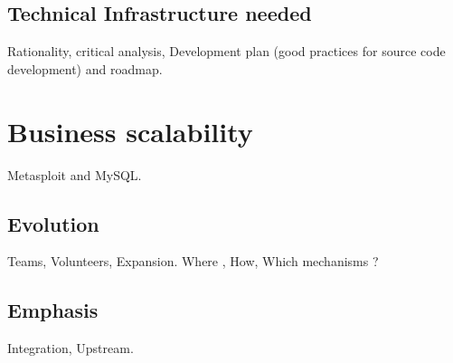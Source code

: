 \documentclass[11pt]{scrartcl}
\begin{document}

\subsection{Technical Infrastructure needed}
\label{sub:infrastructure}

\par Rationality, critical analysis, Development plan (good practices for source code development) and roadmap.


\section{Business scalability}
\label{sec:scalability}

\par Metasploit and MySQL.


\subsection{Evolution}
\label{sub:evolution}

\par Teams, Volunteers, Expansion. Where , How, Which mechanisms ?


\subsection{Emphasis}
\label{sub:emphasis}

\par Integration, Upstream.

\end{document}
